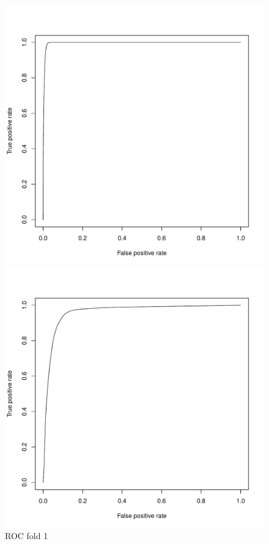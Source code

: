 \documentclass{article}\usepackage[]{graphicx}\usepackage[]{color}
\begin{document}
\begin{figure}[h]
  \includegraphics[width=\linewidth]{ROC_block1.pdf}
  \caption{ROC fold 1}\label{}
\endminipage\hfill
{}
  \includegraphics[width=\linewidth]{ROC_block2.pdf}

\end{figure}
\end{document}

